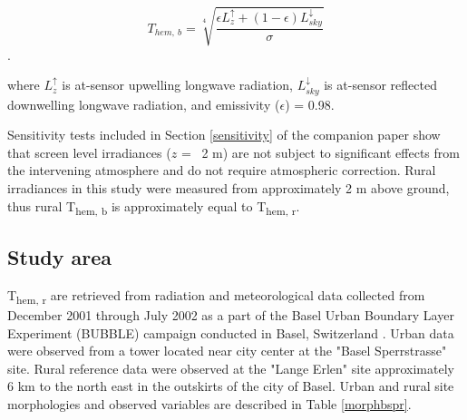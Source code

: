 \begin{equation}
\label{ruralt}
T_{hem,~ b} = \sqrt[4]{\frac{\epsilon L_z^\uparrow + (1 - \epsilon)L_{sky}^\downarrow}{\sigma}}
\end{equation}.

\noindent where $L_z^\uparrow$ is at-sensor upwelling longwave radiation, $L_{sky}^\downarrow$ is at-sensor reflected downwelling longwave radiation, and emissivity ($\epsilon$) = 0.98.

Sensitivity tests included in Section \ref{sensitivity} of the companion paper show that screen level irradiances ($ z $ = ~2 \si{\meter}) are not subject to significant effects from the intervening atmosphere and do not require atmospheric correction. Rural irradiances in this study were measured from approximately 2 \si{\meter} above ground, thus rural T\textsubscript{hem, b} is approximately equal to T\textsubscript{hem, r}.

\subsection{Study area}

T\textsubscript{hem, r} are retrieved from radiation and meteorological data collected from December 2001 through July 2002 as a part of the Basel Urban Boundary Layer Experiment (BUBBLE) campaign conducted in Basel, Switzerland \cite{Rotach2005}. Urban data were observed from a tower located near city center at the "Basel Sperrstrasse" site. Rural reference data were observed at the "Lange Erlen" site approximately 6 \si{\kilo \meter} to the north east in the outskirts of the city of Basel. Urban and rural site morphologies and observed variables are described in Table \ref{morphbspr}.

